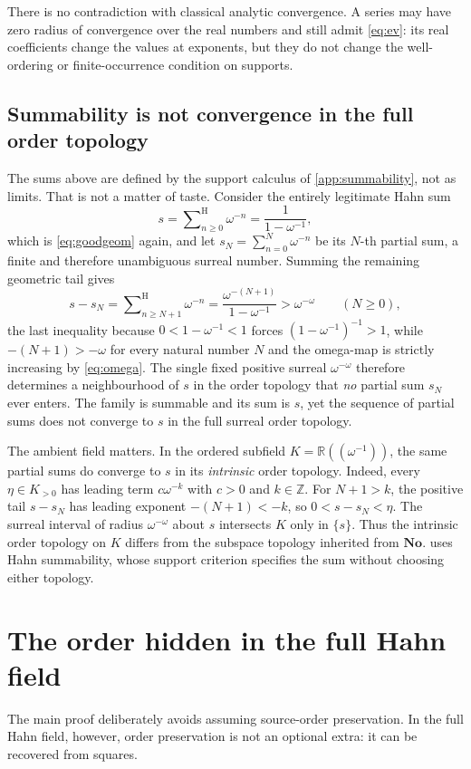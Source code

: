 \documentclass[11pt,letterpaper]{article}
\theoremstyle{definition}
\theoremstyle{remark}
\newcommand{\No}{\mathbf{No}}
\newcommand{\R}{\mathbb R}
\newcommand{\Z}{\mathbb Z}
\newcommand{\seqsum}{\mathop{\sum}\nolimits^{\mathrm H}}
\begin{document}
There is no contradiction with classical analytic convergence. A series may
have zero radius of convergence over the real numbers and still admit
\eqref{eq:ev}: its real coefficients change the values at exponents, but they
do not change the well-ordering or finite-occurrence condition on supports.

\subsection{Summability is not convergence in the full order topology}\label{sec:notlimit}
The sums above are defined by the support calculus of
\cref{app:summability}, not as limits. That is not a matter of taste. Consider
the entirely legitimate Hahn sum
\[
 s=\seqsum_{n\ge0}\omega^{-n}=\frac{1}{1-\omega^{-1}},
\]
which is \eqref{eq:goodgeom} again, and let $s_N=\sum_{n=0}^{N}\omega^{-n}$ be
its $N$-th partial sum, a finite and therefore unambiguous surreal number.
Summing the remaining geometric tail gives
\[
 s-s_N=\seqsum_{n\ge N+1}\omega^{-n}
      =\frac{\omega^{-(N+1)}}{1-\omega^{-1}}
      >\omega^{-\omega}\qquad(N\ge0),
\]
the last inequality because $0<1-\omega^{-1}<1$ forces
$(1-\omega^{-1})^{-1}>1$, while $-(N+1)>-\omega$ for every natural number $N$
and the omega-map is strictly increasing by \eqref{eq:omega}. The single fixed positive
surreal $\omega^{-\omega}$ therefore determines a neighbourhood of $s$ in the
order topology that \emph{no} partial sum $s_N$ ever enters. The family is
summable and its sum is $s$, yet the sequence of partial sums does not
converge to $s$ in the full surreal order topology.

The ambient field matters. In the ordered subfield
$K=\R((\omega^{-1}))$, the same partial sums do converge to $s$ in its
\emph{intrinsic} order topology. Indeed, every $\eta\in K_{>0}$ has leading
term $c\omega^{-k}$ with $c>0$ and $k\in\Z$. For $N+1>k$, the positive
tail $s-s_N$ has leading exponent $-(N+1)<-k$, so $0<s-s_N<\eta$.
The surreal interval of radius $\omega^{-\omega}$ about $s$ intersects $K$
only in $\{s\}$. Thus the intrinsic order topology on $K$ differs from the
subspace topology inherited from $\No$.  uses Hahn summability,
whose support criterion specifies the sum without choosing either topology.

\section{The order hidden in the full Hahn field}\label{sec:order}
The main proof deliberately avoids assuming source-order preservation. In the
full Hahn field, however, order preservation is not an optional extra: it can
be recovered from squares.
\end{document}
